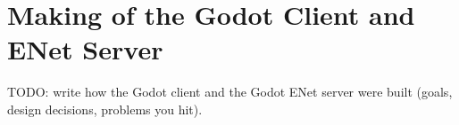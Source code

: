 \section{Making of the Godot Client and ENet Server}
TODO: write how the Godot client and the Godot ENet server were built (goals, design decisions, problems you hit).

